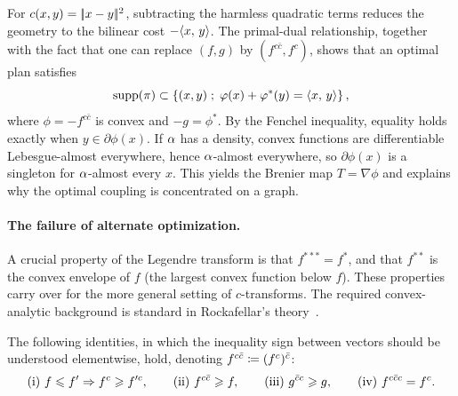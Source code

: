 \begin{rem}\label{rem-proof-brenier}
	For $c(x,y)=|\!| x-y |\!|^2$, subtracting the harmless quadratic terms reduces the geometry to the bilinear cost $-\langle x,\,y\rangle$. The primal-dual relationship, together with the fact that one can replace $(f,g)$ by $(f^{c\bar c},f^c)$, shows that an optimal plan satisfies
	\[
		\operatorname{supp}(\pi)
		\subset
		\left\{ (x,y) \;;\; \varphi(x)+\varphi^*(y)=\langle x,\,y\rangle \right\},
	\]
	where $\phi=-f^{c\bar c}$ is convex and $-g=\phi^*$. By the Fenchel inequality, equality holds exactly when $y\in\partial\phi(x)$. If $\alpha$ has a density, convex functions are differentiable Lebesgue-almost everywhere, hence $\alpha$-almost everywhere, so $\partial\phi(x)$ is a singleton for $\alpha$-almost every $x$. This yields the Brenier map $T=\nabla\phi$ and explains why the optimal coupling is concentrated on a graph.
\end{rem}


\paragraph{The failure of alternate optimization.}

A crucial property of the Legendre transform is that $f^{***}=f^*$, and that $f^{**}$ is the convex envelope of $f$ (the largest convex function below $f$). These properties carry over for the more general setting of $c$-transforms. The required convex-analytic background is standard in Rockafellar's theory~\cite{rockafellar2015convex}.

\begin{prop}
The following identities, in which the inequality sign between vectors should be understood elementwise, hold, denoting $f^{c\bar c} \coloneqq (f^{c})^{\bar c}$:
	\[
		\textnormal{(i) } f \leqslant f' \Rightarrow f^{c}\geqslant f'^{c},
		\qquad
		\textnormal{(ii) } f^{c\bar{c}} \geqslant f,
		\qquad
		\textnormal{(iii) } g^{\bar{c}c} \geqslant g,
		\qquad
		\textnormal{(iv) } f^{c\bar{c}c}=f^{c}.
	\]
\end{prop}

